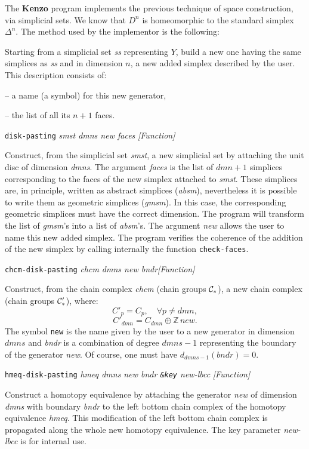 The {\bf Kenzo} program implements the previous technique of  space construction, via simplicial sets.
We know that $D^n$ is homeomorphic to the standard simplex $\Delta^n$. The method used
by the implementor is the following:
\par
Starting from a simplicial set {\em ss} representing $Y$, build a new one having the same simplices
as {\em ss} and in dimension $n$, a new added simplex described by the user. This description
consists of: \par
-- a name (a symbol) for this new generator,\par
-- the list of all its $n+1$ faces.
\newpage
{\parindent=0mm
{\leftskip=5mm
{\tt disk-pasting} {\em smst dmns new faces }\hfill{\em [Function]} \par}
{\leftskip=15mm
Construct, from the  simplicial set  {\em smst}, a new simplicial set
by attaching the unit disc of dimension {\em dmns}. The argument {\em faces} is the
list of  $dmn+1$  simplices corresponding to the faces of the new simplex
attached to {\em smst}. These simplices are, in principle, written as abstract simplices
({\em absm}), nevertheless it is possible to write them as geometric simplices ({\em gmsm}). In this case,
the corresponding geometric simplices must have the correct dimension. The program will transform the list of
{\em gmsm}'s into a list of {\em absm}'s.  The argument {\em new} allows the user to name this new added simplex.
The program verifies the coherence of the addition of the new simplex by calling internally the function
{\tt check-faces}.
\par}
{\leftskip=5mm
{\tt chcm-disk-pasting} {\em chcm dmns new  bndr}\hfill{\em [Function]} \par}
{\leftskip=15mm
Construct, from the chain complex  {\em chcm} (chain groups ${\cal C}_*$), a new chain complex
(chain groups ${\cal C}_*'$), where:
$$C'_p=C_p,\quad \forall p \not= dmn,$$
$$C'_{dmn}= C_{dmn} \oplus \mathbb{Z}\, new.$$
The symbol {\tt new} is the name given by the user to a new generator in dimension $dmns$ and
{\em bndr} is a combination of degree $dmns-1$ representing the  boundary of the
generator {\em new}. Of course, one must have $d_{dmns-1}(bndr)=0.$ \par}
{\leftskip=5mm
{\tt hmeq-disk-pasting} {\em hmeq dmns new bndr {\tt \&key} new-lbcc } \hfill{\em [Function]}\par}
{\leftskip=15mm
Construct a homotopy equivalence by attaching  the  generator {\em new} of dimension {\em dmns}
with boundary {\em bndr} to the left bottom chain complex of the homotopy equivalence {\em hmeq}.
This modification of the left bottom chain complex is propagated along the whole new homotopy equivalence.
The key parameter {\em new-lbcc} is for internal use.
\par}
}


